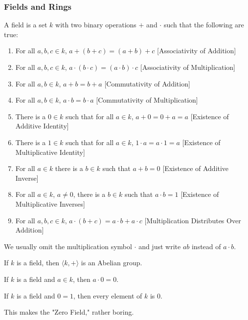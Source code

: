\documentclass[../main.tex]{subfiles}
\begin{document}
\subsubsection{Fields and Rings}
%
\begin{definition}
A field is a set $k$ with two binary operations $+$ and $\cdot$ such that the following are true:
\begin{enumerate}
\item For all $a,b,c\in k$, $a+(b+c)=(a+b)+c$ \hfill [Associativity of Addition]
\item For all $a,b,c\in k$, $a\cdot(b\cdot c) = (a\cdot b)\cdot c$ \hfill [Associativity of Multiplication]
\item For all $a,b\in k$, $a+b=b+a$ \hfill [Commutativity of Addition]
\item For all $a,b\in k$, $a\cdot b = b\cdot a$ \hfill [Commutativity of Multiplication]
\item There is a $0 \in k$ such that for all $a\in k$, $a+0=0+a = a$ \hfill [Existence of Additive Identity]
\item There is a $1\in k$ such that for all $a\in k$, $1\cdot a=a\cdot 1 = a$ \hfill [Existence of Multiplicative Identity]
\item For all $a\in k$ there is a $b\in k$ such that $a+b=0$ \hfill [Existence of Additive Inverse]
\item For all $a\in k$, $a\ne 0$, there is a $b\in k$ such that $a\cdot b = 1$ \hfill [Existence of Multiplicative Inverses]
\item For all $a,b,c\in k$, $a\cdot(b+c) = a\cdot b + a\cdot c$ \hfill [Multiplication Distributes Over Addition]
\end{enumerate}
\end{definition}
%
\begin{remark}
We usually omit the multiplication symbol $\cdot$ and just write $ab$ instead of $a\cdot b$.
\end{remark}
%
\begin{remark}
If $k$ is a field, then $\langle k, + \rangle$ is an Abelian group.
\end{remark}
%
\begin{theorem}
If $k$ is a field and $a\in k$, then $a\cdot 0 = 0$.
\end{theorem}
%
\begin{corollary}
If $k$ is a field and $0=1$, then every element of $k$ is $0$.
\end{corollary}
%
\begin{remark}
This makes the "Zero Field," rather boring.
\end{remark}
\end{document}
